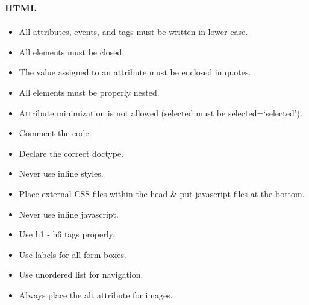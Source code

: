 \documentclass[paper=a4, fontsize=11pt]{scrartcl} %
\numberwithin{equation}{section} %
\numberwithin{figure}{section} %
\numberwithin{table}{section} %
\begin{document}
  \subsection{\textsc{html}}
  \begin{itemize}
    \item All attributes, events, and tags must be written in lower case.
    \item All elements must be closed.
    \item The value assigned to an attribute must be enclosed in quotes.
    \item All elements must be properly nested.
    \item Attribute minimization is not allowed (selected must be selected=`selected').
    \item Comment the code.
    \item Declare the correct doctype.
    \item Never use inline styles.
    \item Place external CSS files within the head \& put  javascript files at the bottom.
    \item Never use inline javascript.
    \item Use h1 - h6 tags properly.
    \item Use labels for all form boxes.
    \item Use unordered list for navigation.
    \item Always place the alt attribute for images.
  \end{itemize}
 \clearpage
  
  
\end{document}
